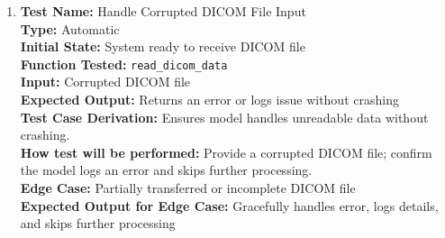 \documentclass[12pt, titlepage]{article}
\begin{document}
\begin{enumerate}
  \item \textbf{Test Name:}  Handle Corrupted DICOM File Input\\
    \textbf{Type:}  Automatic\\
    \textbf{Initial State:}  System ready to receive DICOM file\\
    \textbf{Function Tested:}  \verb|read_dicom_data|\\
    \textbf{Input:}  Corrupted DICOM file\\
    \textbf{Expected Output:}  Returns an error or logs issue without crashing\\
    \textbf{Test Case Derivation:}  Ensures model handles unreadable data without crashing.\\
    \textbf{How test will be performed:}  Provide a corrupted DICOM file; confirm the model logs an error and skips further processing.\\
    \textbf{Edge Case:}  Partially transferred or incomplete DICOM file\\
    \textbf{Expected Output for Edge Case:}  Gracefully handles error, logs details, and skips further processing\\
\end{enumerate}
\end{document}
